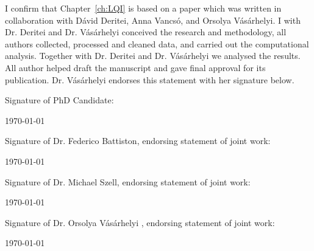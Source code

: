 \documentclass[a4paper,twoside,12pt]{book}
\begin{document}
\vspace{.2cm}

\noindent
I confirm that Chapter~\ref{ch:LQI} is based on a paper which was written in collaboration with D\'avid Deritei, Anna Vancs\'o, and Orsolya V\'as\'arhelyi. I with Dr. Deritei and Dr. V\'as\'arhelyi conceived the research and methodology, all authors collected, processed and cleaned data, and carried out the computational analysis. Together with Dr. Deritei and Dr. V\'as\'arhelyi we analysed the results. All author helped draft the manuscript and gave final approval for its publication. Dr. V\'as\'arhelyi endorses this statement with her signature below.

\vspace{0.5cm}
\noindent
Signature of PhD Candidate:

\vspace{2cm}
\noindent
\monthyeardate\today


\vspace{3.5cm}
\noindent
Signature of Dr. Federico Battiston, endorsing statement of joint work:

\vspace{2cm}
\noindent
\monthyeardate\today


\vspace{3.5cm}
\noindent
Signature of Dr. Michael Szell, endorsing statement of joint work:

\vspace{2cm}
\noindent
\monthyeardate\today

\vspace{3.5cm}
\noindent
Signature of Dr. Orsolya V\'as\'arhelyi , endorsing statement of joint work:

\vspace{2cm}
\noindent
\monthyeardate\today
\end{document}
